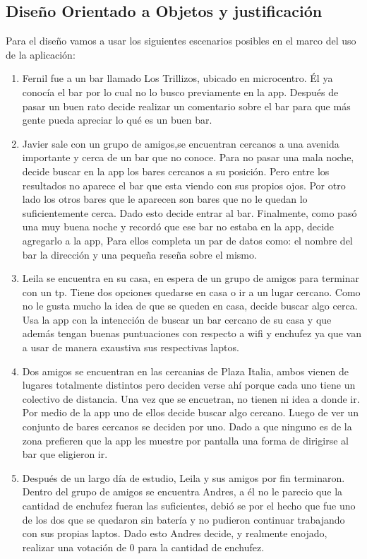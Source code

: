 \subsection{Diseño Orientado a Objetos y justificación}

Para el diseño vamos a usar los siguientes escenarios posibles en el marco del uso de la aplicación:

\begin{enumerate}
\item Fernil fue a un bar llamado Los Trillizos, ubicado en microcentro. Él ya conocía el bar por lo cual no lo busco previamente en la app. Después de pasar un buen rato decide realizar un comentario sobre el bar para que más gente pueda apreciar lo qué es un buen bar.

\item Javier sale con un grupo de amigos,se encuentran cercanos a una avenida importante y cerca de un bar que no conoce. Para no pasar una mala noche, decide buscar en la app los bares cercanos a su posición. Pero entre los resultados no aparece el bar que esta viendo con sus propios ojos. Por otro lado los otros bares que le aparecen son bares que no le quedan lo suficientemente cerca. Dado esto decide entrar al bar. Finalmente, como pasó una muy buena noche y recordó que ese bar no estaba en la app, decide agregarlo a la app, Para ellos completa un par de datos como: el nombre del bar la dirección y una pequeña reseña sobre el mismo. 

\item Leila se encuentra en su casa, en espera de un grupo de amigos para terminar con un tp. Tiene dos opciones quedarse en casa o ir a un lugar cercano. Como no le gusta mucho la idea de que se queden en casa, decide buscar algo cerca. Usa la app con la intencción de buscar un bar cercano de su casa y que además tengan buenas puntuaciones con respecto a wifi y enchufez ya que van a usar de manera exaustiva sus respectivas laptos.

\item Dos amigos se encuentran en las cercanias de Plaza Italia, ambos vienen de lugares totalmente distintos pero deciden verse ahí porque cada uno tiene un colectivo de distancia. Una vez que se encuetran, no tienen ni idea a donde ir. Por medio de la app uno de ellos decide buscar algo cercano. Luego de ver un conjunto de bares cercanos se deciden por uno. Dado a que ninguno es de la zona prefieren que la app les muestre por pantalla una forma de dirigirse al bar que eligieron ir.

\item Después de un largo día de estudio, Leila y sus amigos por fin terminaron. Dentro del grupo de amigos se encuentra Andres, a él no le parecio que la cantidad de enchufez fueran las suficientes, debió se por el hecho que fue uno de los dos que se quedaron sin batería y no pudieron continuar trabajando con sus propias laptos. Dado esto Andres decide, y realmente enojado, realizar una votación de 0 para la cantidad de enchufez.  

\end{enumerate}


